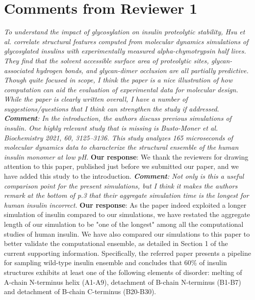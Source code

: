 \documentclass[sn-vancouver]{sn-jnl}
\begin{document}
\section*{Comments from Reviewer 1}
\textit{To understand the impact of glycosylation on insulin proteolytic stability, Hsu et al. correlate structural features computed from molecular dynamics simulations of glycosylated insulins with experimentally measured alpha-chymotrypsin half lives.  They find that the solvent accessible surface area of proteolytic sites, glycan-associated hydrogen bonds, and glycan-dimer occlusion are all partially predictive.  Though quite focused in scope, I think the paper is a nice illustration of how computation can aid the evaluation of experimental data for molecular design.  While the paper is clearly written overall, I have a number of suggestions/questions that I think can strengthen the study if addressed}.
\newline
\indent
\textit{\textbf{Comment}: In the introduction, the authors discuss previous simulations of insulin.  One highly relevant study that is missing is Busto-Moner et al. Biochemistry 2021, 60, 3125--3136. This study analyzes 165 microseconds of molecular dynamics data to characterize the structural ensemble of the human insulin monomer at low pH.} 
\newline
\indent
{\bf Our response}: We thank the reviewers for drawing attention to this paper, published just before we submitted our paper, and we have added this study to the introduction.
\newline
\newline
\indent
\textit{\textbf{Comment}: Not only is this a useful comparison point for the present simulations, but I think it makes the authors remark at the bottom of p.3 that their aggregate simulation time is the longest for human insulin incorrect.} 
\newline
\indent
{\bf Our response}: As the paper indeed exploited a longer simulation of insulin compared to our simulations, we have restated the aggregate length of our simulation to be "one of the longest" among all the computational studies of human insulin. We have also compared our simulations to this paper to better validate the computational ensemble, as detailed in Section 1 of the current supporting information. Specifically, the referred paper presents a pipeline for sampling wild-type insulin ensemble and concludes that 60\% of insulin structures exhibits at least one of the following elements of disorder: melting of A-chain N-terminus helix (A1-A9), detachment of B-chain N-terminus (B1-B7) and detachment of B-chain C-terminus (B20-B30). 
\end{document}
